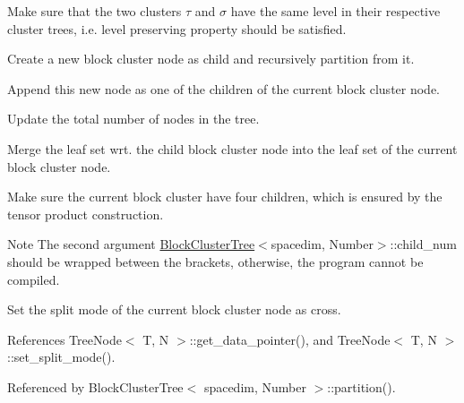 Make sure that the two clusters $\tau$ and $\sigma$ have the same level in their respective cluster trees, i.\+e. level preserving property should be satisfied.

Create a new block cluster node as child and recursively partition from it.

Append this new node as one of the children of the current block cluster node.

Update the total number of nodes in the tree.

Merge the leaf set wrt. the child block cluster node into the leaf set of the current block cluster node.

Make sure the current block cluster have four children, which is ensured by the tensor product construction.


\begin{DoxyDescription}
\item[Note ]The second argument {\ttfamily \hyperlink{classBlockClusterTree}{Block\+Cluster\+Tree}$<$spacedim}, Number$>$\+::child\+\_\+num should be wrapped between the brackets, otherwise, the program cannot be compiled. 
\end{DoxyDescription}

Set the split mode of the current block cluster node as cross.

References Tree\+Node$<$ T, N $>$\+::get\+\_\+data\+\_\+pointer(), and Tree\+Node$<$ T, N $>$\+::set\+\_\+split\+\_\+mode().



Referenced by Block\+Cluster\+Tree$<$ spacedim, Number $>$\+::partition().

\mbox{\label{classBlockClusterTree_a425583a70d63ddbf9341a31b736bd0fe}} 

